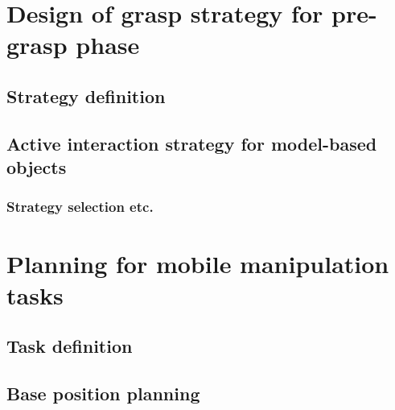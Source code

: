 \section{Design of grasp strategy for pre-grasp phase}

\subsection{Strategy definition}
 
\subsection{Active interaction strategy for model-based objects}

\subsubsection{Strategy selection etc.}

\section{Planning for mobile manipulation tasks}
\subsection{Task definition}
\subsection{Base position planning}

